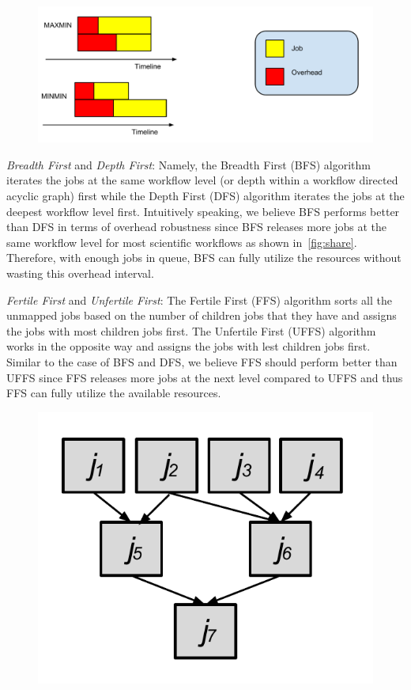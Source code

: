 \documentclass[final]{IEEEtran}
\begin{document}
\begin{figure}[htb]
\centering
 \includegraphics[width=1.0\linewidth]{figure/longest.pdf}
  \label{fig:longest}
  \vspace{-10pt}
\end{figure}
\emph{Breadth First} and \emph{Depth First}: Namely, the Breadth First (BFS) algorithm iterates the jobs at the same workflow level (or depth within a workflow directed acyclic graph) first while the Depth First (DFS) algorithm iterates the jobs at the deepest workflow level first. Intuitively speaking, we believe BFS performs better than DFS in terms of overhead robustness since BFS releases more jobs at the same workflow level for most scientific workflows as shown in~\ref{fig:share}. Therefore, with enough jobs in queue, BFS can fully utilize the resources without wasting this overhead interval.  

\emph{Fertile First} and \emph{Unfertile First}: The Fertile First (FFS) algorithm sorts all the unmapped jobs based on the number of children jobs that they have and assigns the jobs with most children jobs first. The Unfertile First (UFFS) algorithm works in the opposite way and assigns the jobs with lest children jobs first. Similar to the case of BFS and DFS, we believe FFS should perform better than UFFS since FFS releases more jobs at the next level compared to UFFS and thus FFS can fully utilize the available resources. 

\begin{figure}[htb]
\centering
 \includegraphics[width=0.6\linewidth]{figure/impact_factor.pdf}
  \label{fig:impact}
  \vspace{-10pt}
\end{figure}
\end{document}
